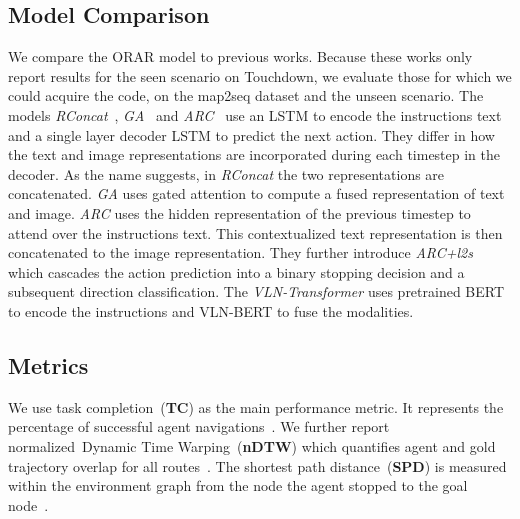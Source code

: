 \documentclass[11pt]{article}
\begin{document}
\subsection{Model Comparison}
We compare the ORAR model to previous works. Because these works only report results for the seen scenario on Touchdown, we evaluate those for which we could acquire the code, on the map2seq dataset and the unseen scenario. The models \textit{RConcat}~\cite{city_without_map, Chen2018Touchdown}, \textit{GA}~\cite{gated_attention, Chen2018Touchdown} and \textit{ARC}~\cite{Xiang2020LearningNavigation} use an LSTM to encode the instructions text and a single layer decoder LSTM to predict the next action. They differ in how the text and image representations are incorporated during each timestep in the decoder. As the name suggests, in \textit{RConcat} the two representations are concatenated. \textit{GA} uses gated attention to compute a fused representation of text and image. \textit{ARC} uses the hidden representation of the previous timestep to attend over the instructions text. This contextualized text representation is then concatenated to the image representation. They further introduce \textit{ARC+l2s} which cascades the action prediction into a binary stopping decision and a subsequent direction classification. The \textit{VLN-Transformer} \cite{Zhu2020MultimodalNavigation} uses pretrained BERT \cite{devlin-etal-2019-bert} to encode the instructions and VLN-BERT \cite{web_image_pairs} to fuse the modalities.

\subsection{Metrics}
We use task completion~(\textbf{TC}) as the main performance metric. It represents the percentage of successful agent navigations~\cite{Chen2018Touchdown}. We further report normalized~Dynamic Time Warping~(\textbf{nDTW}) which quantifies agent and gold trajectory overlap for all routes~\cite{ndtw}. The shortest path distance~(\textbf{SPD}) is measured within the environment graph from the node the agent stopped to the goal node~\cite{Chen2018Touchdown}.
\end{document}
